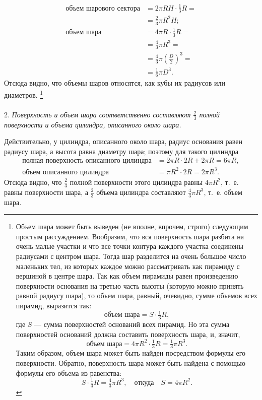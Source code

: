 \documentclass[twoside]{book}
\begin{document}
\begin{align*}
\text{объем шарового сектора}&= 2\pi RH\cdot \tfrac13 R =
\\
&= \tfrac23 \pi R^2 H;
\\
\text{объем шара} &= 4\pi R\cdot \tfrac13 R = 
\\
&=\tfrac43\pi R^3=
\\
&= \tfrac43\pi\left(\frac D2\right)^3=
\\
&= \tfrac16\pi D^3.
\end{align*}
Отсюда видно, что объемы шаров относятся, как кубы их радиусов или диаметров.%
\footnote{Объем шара может быть выведен (не вполне, впрочем, строго) следующим простым рассуждением.
Вообразим, что вся поверхность шара разбита на очень малые участки и что все точки контура каждого участка соединены радиусами с центром шара.
Тогда шар разделится на очень большое число маленьких тел, из которых каждое можно рассматривать как пирамиду с вершиной в центре шара.
Так как объем пирамиды равен произведению поверхности основания на третью часть высоты (которую можно принять равной радиусу шара), то объем шара, равный, очевидно, сумме объемов всех пирамид, выразится так:
\[\text{объем шара} = S \cdot \tfrac13 R,\]
где $S$ --- сумма поверхностей оснований всех пирамид.
Но эта сумма поверхностей оснований должна составить поверхность шара, и, значит,
\[\text{объем шара} = 4\pi R^2\cdot \tfrac13  R = \tfrac13  \pi R^3.\]
Таким образом, объем шара может быть найден посредством формулы его поверхности.
Обратно, поверхность шара может быть найдена с помощью формулы его объема из равенства:
\[S\cdot \tfrac13 R = \tfrac43 \pi R^3,\quad\text{откуда}\quad S = 4\pi R^2.\]
}

\paragraph{}\label{1938/s146}
 2.
\emph{Поверхность и объем шара соответственно составляют $\tfrac23$ полной поверхности и объема цилиндра, описанного около шара.}

Действительно, у цилиндра, описанного около шара, радиус основания равен радиусу шара, а высота равна диаметру шара;
поэтому для такого цилиндра
\begin{align*}
\text{полная поверхность описанного цилиндра} &= 2\pi R \cdot 2R + 2\pi R = 6\pi R,
\\
\text{объем описанного цилиндра} &= \pi R^2\cdot 2R = 2\pi R^3.
\end{align*}
Отсюда видно, что $\tfrac23$ полной поверхности этого цилиндра равны $4\pi R^2$, т.~е. равны поверхности шара, а $\tfrac23$ объема цилиндра составляют $\tfrac43\pi R^3$, т.~е. объем шара.
\end{document}

